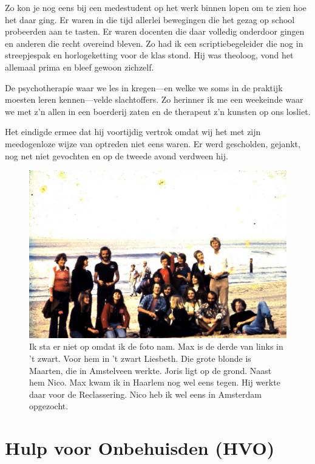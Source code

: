 \documentclass[10pt,twoside, openright]{memoir}
\begin{document}
Zo kon je nog eens bij een medestudent op het werk binnen lopen om te zien hoe het daar ging. Er waren in die tijd allerlei bewegingen die het gezag op school probeerden aan te tasten. Er waren docenten die daar volledig onderdoor gingen en anderen die recht overeind bleven. Zo had ik een scriptiebegeleider die nog in streepjespak en horlogeketting voor de klas stond. Hij was theoloog, vond het allemaal prima en bleef gewoon zichzelf. 

De psychotherapie waar we les in kregen---en welke we soms in de praktijk moesten leren kennen---velde slachtoffers. Zo herinner ik me een weekeinde waar we met z’n allen in een boerderij zaten en de therapeut z’n kunsten op ons losliet. 

Het eindigde ermee dat hij voortijdig vertrok omdat wij het met zijn meedogenloze wijze van optreden niet eens waren. Er werd gescholden, gejankt, nog net niet gevochten en op de tweede avond verdween hij.

\begin{figure}
\includegraphics[width=\textwidth]{img/ch42/4-9-2009_002}
\caption*{\footnotesize Ik sta er niet op omdat ik de foto nam. Max is de derde van links in ’t zwart. Voor hem in ’t zwart Liesbeth. Die grote blonde is Maarten, die in Amstelveen werkte. Joris ligt op de grond. Naast hem Nico. Max kwam ik in Haarlem nog wel eens tegen. Hij werkte daar voor de Reclassering. Nico heb ik wel eens in Amsterdam opgezocht.}
\end{figure}

\section{Hulp voor Onbehuisden (HVO)} %
\label{cha:hvo}
\end{document}
